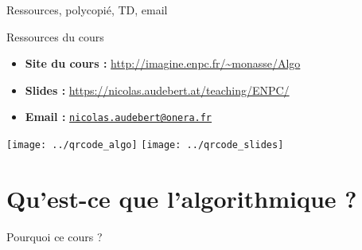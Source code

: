 
\date[15 fév. 2017]{Mercredi 15 février 2017}
\subtitle{Complexité et structures de données}
\maketitle

\begin{frame}{Ressources, polycopié, TD, email}

\begin{block}{Ressources du cours}
    \begin{itemize}
    \item \textbf{Site du cours :} \url{http://imagine.enpc.fr/~monasse/Algo}
    \item \textbf{Slides :} \url{https://nicolas.audebert.at/teaching/ENPC/}
    \item \textbf{Email :} \href{mailto:nicolas.audebert@onera.fr}{\texttt{nicolas.audebert@onera.fr}}
    \end{itemize}
\end{block}

\centering
\texttt{[image: ../qrcode\_algo]}
\texttt{[image: ../qrcode\_slides]}

\end{frame}

\section{Qu'est-ce que l'algorithmique ?}
\begin{frame}{Pourquoi ce cours ?}



\end{frame}

